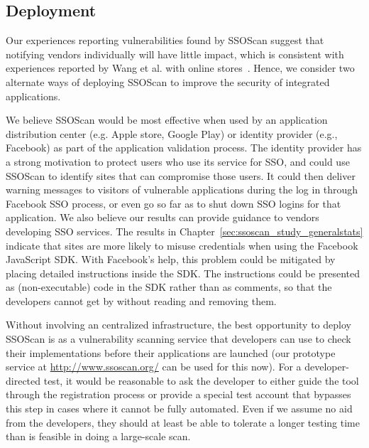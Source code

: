 \subsection{Deployment}\label{sec:deployment}
Our experiences reporting vulnerabilities found by SSOScan suggest that notifying vendors individually will have little impact, which is consistent with experiences reported by Wang et al. with online stores~\cite{Wang:2011:SFO:2006077.2006782}.  Hence, we consider two alternate ways of deploying SSOScan to improve the security of integrated applications.

 We believe SSOScan would be most effective when used by an application distribution center (e.g. Apple store, Google Play) or identity provider (e.g., Facebook) as part of the application validation process.  The identity provider has a strong motivation to protect users who use its service for SSO, and could use SSOScan to identify sites that can compromise those users.  It could then deliver warning messages to visitors of vulnerable applications during the log in through Facebook SSO process, or even go so far as to shut down SSO logins for that application.  We also believe our results can provide guidance to vendors developing SSO services.  The results in Chapter~\ref{sec:ssoscan_study_generalstats} indicate that sites are more likely to misuse credentials when using the Facebook JavaScript SDK.  With Facebook's help, this problem could be mitigated by placing detailed instructions inside the SDK.  The instructions could be presented as (non-executable) code in the SDK rather than as comments, so that the developers cannot get by without reading and removing them.

 Without involving an centralized infrastructure, the best opportunity to deploy SSOScan is as a vulnerability scanning service that developers can use to check their implementations before their applications are launched (our prototype service at \url{http://www.ssoscan.org/} can be used for this now).  For a developer-directed test, it would be reasonable to ask the developer to either guide the tool through the registration process or provide a special test account that bypasses this step in cases where it cannot be fully automated.  Even if we assume no aid from the developers, they should at least be able to tolerate a longer testing time than is feasible in doing a large-scale scan.